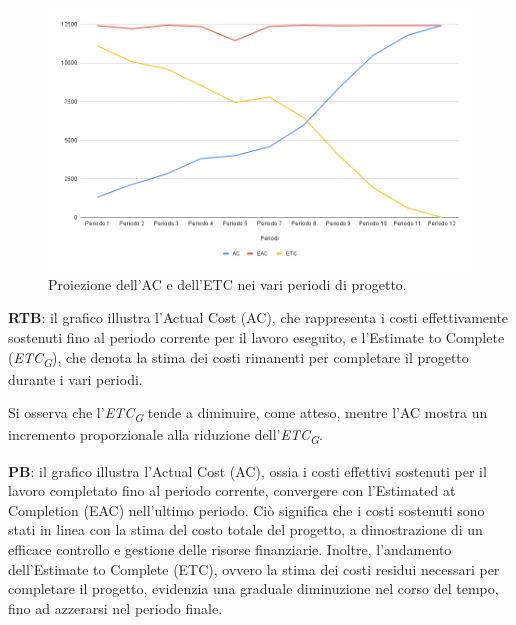\begin{figure}[H]
    \centering
    \includegraphics[width=1\textwidth]{../Images/PianoDiQualifica/AC_ETC.png}
    \caption{Proiezione dell’AC e dell’ETC nei vari periodi di progetto.}
    \label{fig:4}
\end{figure}

\vspace{0.2cm}

\textbf{RTB}: il grafico illustra l'Actual Cost (AC), che rappresenta i costi effettivamente sostenuti fino al periodo corrente per il lavoro eseguito, e l'Estimate to Complete (\textit{ETC}\textsubscript{\textit{G}}), che denota la stima dei costi rimanenti per completare il progetto durante i vari periodi.

\vspace{0.2cm}

Si osserva che l'\textit{ETC}\textsubscript{\textit{G}} tende a diminuire, come atteso, mentre l'AC mostra un incremento proporzionale alla riduzione dell'\textit{ETC}\textsubscript{\textit{G}}.

\vspace{0.2cm}
\textbf{PB}: il grafico illustra l'Actual Cost (AC), ossia i costi effettivi sostenuti per il lavoro completato fino al periodo corrente, convergere con l'Estimated at Completion (EAC) nell'ultimo periodo.
Ciò significa che i costi sostenuti sono stati in linea con la stima del costo totale del progetto, a dimostrazione di un efficace controllo e gestione delle risorse finanziarie. Inoltre, l'andamento dell'Estimate to Complete (ETC), ovvero la stima dei costi residui necessari per completare il progetto, evidenzia una graduale diminuzione nel corso del tempo, fino ad azzerarsi nel periodo finale.

